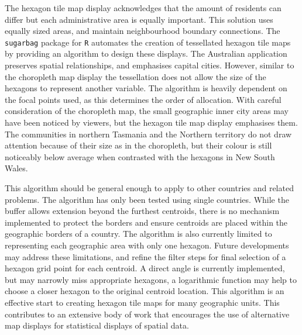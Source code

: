 The hexagon tile map display acknowledges that the amount of residents
can differ but each administrative area is equally important. This
solution uses equally sized areas, and maintain neighbourhood boundary
connections. The \texttt{sugarbag} package for \texttt{R} automates the
creation of tessellated hexagon tile maps by providing an algorithm to
design these displays. The Australian application preserves spatial
relationships, and emphasises capital cities. However, similar to the
choropleth map display the tessellation does not allow the size of the
hexagons to represent another variable. The algorithm is heavily
dependent on the focal points used, as this determines the order of
allocation. With careful consideration of the choropleth map, the small
geographic inner city areas may have been noticed by viewers, but the
hexagon tile map display emphasises them. The communities in northern
Tasmania and the Northern territory do not draw attention because of
their size as in the choropleth, but their colour is still noticeably
below average when contrasted with the hexagons in New South Wales.

This algorithm should be general enough to apply to other countries and
related problems. The algorithm has only been tested using single
countries. While the buffer allows extension beyond the furthest
centroids, there is no mechanism implemented to protect the borders and
ensure centroids are placed within the geographic borders of a country.
The algorithm is also currently limited to representing each geographic
area with only one hexagon. Future developments may address these
limitations, and refine the filter steps for final selection of a
hexagon grid point for each centroid. A direct angle is currently
implemented, but may narrowly miss appropriate hexagons, a logarithmic
function may help to choose a closer hexagon to the original centroid
location. This algorithm is an effective start to creating hexagon tile
maps for many geographic units. This contributes to an extensive body of
work that encourages the use of alternative map displays for statistical
displays of spatial data.



\address{%
Stephanie Kobakian\\
Monash University\\%
Department of Econometrics and Business Statistics\\
%
%
%
\\\href{mailto:stephanie.kobakian@monash.edu}{\nolinkurl{stephanie.kobakian@monash.edu}}
}

